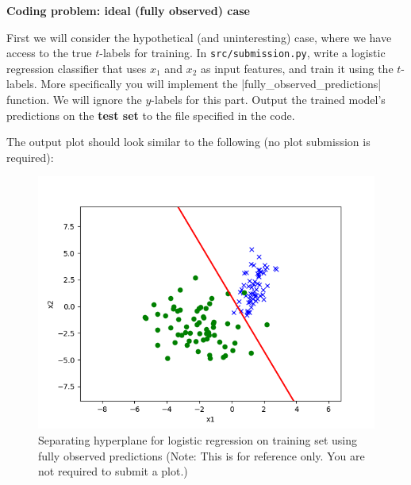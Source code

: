 \item {} \textbf{Coding problem: ideal (fully observed) case}

First we will consider the hypothetical (and uninteresting) case, where we have access to the true
$t$-labels for training. In \texttt{src/submission.py}, write a logistic
regression classifier that uses $x_1$ and $x_2$ as input features, and train it
using the $t$-labels. More specifically you will implement the |fully_observed_predictions| function.
We will ignore the $y$-labels for this part. Output the
trained model's predictions on the \textbf{test set} to the file specified in the code.

The output plot should look similar to the following (no plot submission is required):
\begin{figure}[H]
	\centering
	\vspace{2mm}
	\includegraphics[width=0.5\linewidth]{02-posonly/posonly_true_pred.png}
    \caption{Separating hyperplane for logistic regression on training set using fully observed predictions (Note: This is for reference only.  You are not required to submit a plot.)}
\end{figure}
